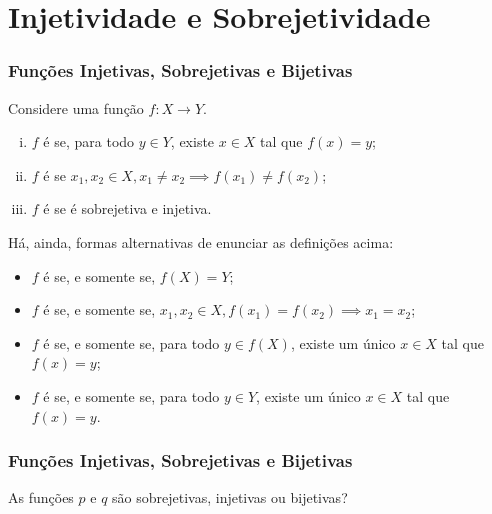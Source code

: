 \documentclass[brazil, notheorems, 10pt]{beamer}
\begin{document}
\section{Injetividade e Sobrejetividade}
\begin{frame}
\frametitle{Funções Injetivas, Sobrejetivas e Bijetivas} %


\begin{definicao}
Considere uma função $f: X \to Y$.
\begin{enumerate}[(i)]
	\item $f$ é  se, para todo $y \in Y$, existe $x
	\in X$ tal que $f(x) = y$;
	\item $f$ é  se $x_1, x_2 \in X, x_1 \neq x_2
	\implies f(x_1) \neq f(x_2)$;
	\item $f$ é  se é sobrejetiva e injetiva.
\end{enumerate}
\end{definicao}\pause
Há, ainda, formas alternativas de enunciar as definições acima:
\begin{itemize}
	\item $f$ é  se, e somente se, $f(X) = Y$;
	\item $f$ é  se, e somente se, $x_1, x_2 \in X, f(x_1) = f(x_2)
	\implies x_1 = x_2 $;
	\item $f$ é  se, e somente se, para todo $y \in
	f(X)$, existe um único $x \in X$ tal que $f(x) = y$;
	\item $f$ é  se, e somente se, para todo $y \in Y$,
	existe um único $x \in X$ tal que $f(x) = y$.
\end{itemize}
\end{frame}




\begin{frame}
\frametitle{Funções Injetivas, Sobrejetivas e Bijetivas} %

\begin{exemplo}\label{pqbij}
As funções $p$ e $q$ são sobrejetivas, injetivas ou bijetivas?
\end{exemplo}
\end{frame}



\end{document}
